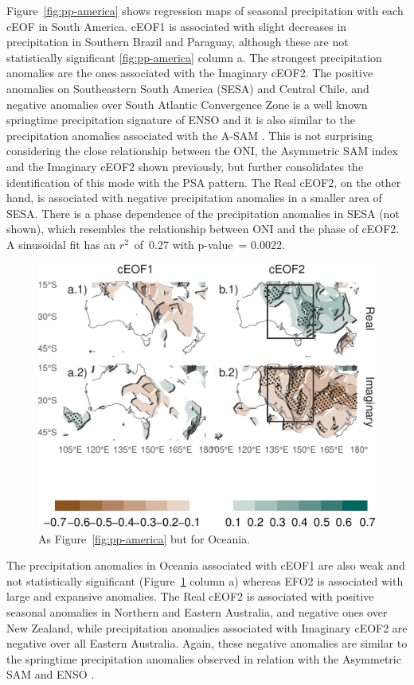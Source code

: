 \documentclass[smallextended]{svjour3}       %
\begin{document}
Figure~\ref{fig:pp-america} shows regression maps of seasonal precipitation with each cEOF in South America. cEOF1 is associated with slight decreases in precipitation in Southern Brazil and Paraguay, although these are not statistically significant \ref{fig:pp-america} column a. The strongest precipitation anomalies are the ones associated with the Imaginary cEOF2. The positive anomalies on Southeastern South America (SESA) and Central Chile, and negative anomalies over South Atlantic Convergence Zone is a well known springtime precipitation signature of ENSO \citep{cai2020a} and it is also similar to the precipitation anomalies associated with the A-SAM \citep{campitelli2021}. This is not surprising considering the close relationship between the ONI, the Asymmetric SAM index and the Imaginary cEOF2 shown previously, but further consolidates the identification of this mode with the PSA pattern. The Real cEOF2, on the other hand, is associated with negative precipitation anomalies in a smaller area of SESA. There is a phase dependence of the precipitation anomalies in SESA (not shown), which resembles the relationship between ONI and the phase of cEOF2. A sinusoidal fit has an \(r^2\)~of~0.27 with p-value~= 0.0022.



\begin{figure}
\centering
\includegraphics{../figures/pp-oceania-1.pdf}
\caption{\label{fig:pp-oceania}As Figure~\ref{fig:pp-america} but for Oceania.}
\end{figure}

The precipitation anomalies in Oceania associated with cEOF1 are also weak and not statistically significant (Figure~\ref{fig:pp-oceania} column a) whereas EFO2 is associated with large and expansive anomalies. The Real cEOF2 is associated with positive seasonal anomalies in Northern and Eastern Australia, and negative ones over New Zealand, while precipitation anomalies associated with Imaginary cEOF2 are negative over all Eastern Australia. Again, these negative anomalies are similar to the springtime precipitation anomalies observed in relation with the Asymmetric SAM \citep{campitelli2021} and ENSO \citep{cai2011}.
\end{document}
